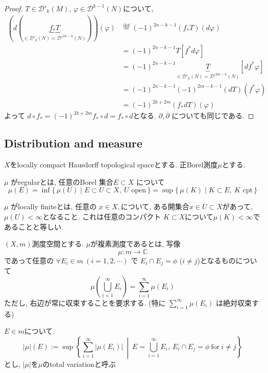 \begin{proof}
\( T\in \mathcal{D}'_{k}(M) \), \( \varphi\in \mathcal{D}^{k-1}(N) \)について, 
\begin{align*}
(d(\underbrace{f_*T}_{\in  \mathcal{D}'_{k}(N)= \mathcal{D}'^{2n-k}(N)  }))(\varphi)
&\overset{\text{def}}{=}
(-1)^{2n-k-1}(f_*T)(d\varphi)
\\
&=
(-1)^{2n-k-1}T[f^*d\varphi]
\\
&=
(-1)^{2n-k-1}\underbrace{T}_{ \in \mathcal{D}'_{k}(N)= \mathcal{D}'^{2m-k}(N)  }[df^*\varphi]
\\
&=
(-1)^{2n-k-1}(-1)^{2m-k-1}(dT)(f^*\varphi)
\\
&=
(-1)^{2k+2m}(f_*dT)(\varphi)
\end{align*}
よって
$d\circ f_* = (-1)^{2k+2m} f_*\circ d = f_*\circ d$となる. 
\( \partial,\overline{\partial} \) についても同じである. 
\end{proof}

\subsection{Distribution and measure}

\begin{tcolorbox}[mybox]
\begin{defn}
\label{defn-M-4.2.7}
$X$をlocally compact Hausdorff topological spaceとする. 
正Borel測度\( \mu \)とする. 

\( \mu \) がregularとは, 
任意のBorel 集合\( E\subset X \) について
\[
\mu(E)=\inf\{\,\mu(U)\mid E\subset U\subset X,\ U \text{ open}\,\}
=\sup\{\,\mu(K)\mid K\subset E,\ K \text{ cpt}\,\}
\]

\( \mu \) がlocally finiteとは, 
任意の
\( x\in X,\)について, ある開集合\( x\in  U\subset X \)があって, 
\(\mu(U)<\infty
\)となること. 
これは任意のコンパクト
\(K\subset X \)について\(\mu(K)<\infty\)であることと等しい. 
\end{defn}
\end{tcolorbox}


\begin{tcolorbox}[mybox]
\begin{defn}
\label{defn-M-4.2.8}
 $(X, m )$測度空間とする. 
$\mu$が複素測度であるとは, 写像
\[
\mu: m \to \mathbb{C}
\]
であって任意の
 $\forall E_i\in m\ (i=1,2,\cdots)$ で $E_i\cap E_j=\phi$ ($i\neq j$)となるものについて
 $$
 \mu\left(\bigcup_{i=1}^{\infty} E_i\right)=\sum_{i=1}^{\infty}\mu(E_i)
 $$
ただし, 右辺が常に収束することを要求する.
(特に $\sum_{i=1}^{\infty}\mu(E_i)$ は絶対収束する)

$E\in m$について. 
\[
|\mu|(E):=\sup\left\{\sum_{i=1}^{\infty}|\mu(E_i)|\ \middle|\ E=\bigcup_{i=1}^{\infty}E_i,\ 
E_i\cap E_j=\phi \ \text{for}\ i\neq j\right\}
\]
とし, 
$|\mu|$を$\mu$のtotal variationと呼ぶ

\end{defn}
\end{tcolorbox}

